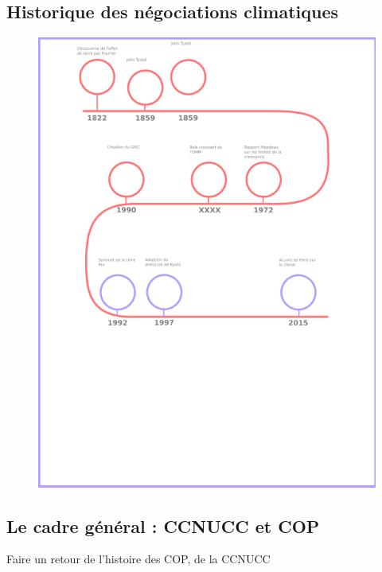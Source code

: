 
\subsection{Historique des négociations climatiques}
\label{sect:1.2.1}



\begin{figure}
    \centering
    \includegraphics[width=\linewidth]{illustrations/frise.png}
    \label{fig:frise}
\end{figure}

\subsection{Le cadre général : CCNUCC et COP}
\label{sect:1.2.2}
Faire un retour de l'histoire des COP, de la CCNUCC 

